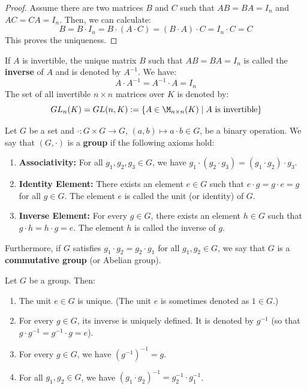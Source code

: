 \begin{proof}
Assume there are two matrices $B$ and $C$ such that $AB = BA = I_n$ and $AC = CA = I_n$. Then, we can calculate:
\begin{equation*}
    B = B \cdot I_n = B \cdot (A \cdot C) = (B \cdot A) \cdot C = I_n \cdot C = C
\end{equation*}
This proves the uniqueness.
\end{proof}

\begin{definition}
If $A$ is invertible, the unique matrix $B$ such that $AB = BA = I_n$ is called the \textbf{inverse} of $A$ and is denoted by $A^{-1}$. We have:
\begin{equation*}
    A \cdot A^{-1} = A^{-1} \cdot A = I_n
\end{equation*}
The set of all invertible $n \times n$ matrices over $K$ is denoted by:
\begin{equation*}
    GL_n(K) = GL(n, K) := \{A \in \M_{n \times n}(K) \mid A \text{ is invertible}\}
\end{equation*}
\end{definition}

\begin{definition}[Group]
Let $G$ be a set and $\cdot : G \times G \to G$, $(a,b) \mapsto a \cdot b \in G$, be a binary operation. We say that $(G, \cdot)$ is a \textbf{group} if the following axioms hold:
\begin{enumerate}
    \item \textbf{Associativity:} For all $g_1, g_2, g_3 \in G$, we have $g_1 \cdot (g_2 \cdot g_3) = (g_1 \cdot g_2) \cdot g_3$.
    \item \textbf{Identity Element:} There exists an element $e \in G$ such that $e \cdot g = g \cdot e = g$ for all $g \in G$. The element $e$ is called the unit (or identity) of $G$.
    \item \textbf{Inverse Element:} For every $g \in G$, there exists an element $h \in G$ such that $g \cdot h = h \cdot g = e$. The element $h$ is called the inverse of $g$.
\end{enumerate}
Furthermore, if $G$ satisfies $g_1 \cdot g_2 = g_2 \cdot g_1$ for all $g_1, g_2 \in G$, we say that $G$ is a \textbf{commutative group} (or Abelian group).
\end{definition}

\begin{proposition} \label{prop:17.a.6}
Let $G$ be a group. Then:
\begin{enumerate}
    \item The unit $e \in G$ is unique. (The unit $e$ is sometimes denoted as $1 \in G$.)
    \item For every $g \in G$, its inverse is uniquely defined. It is denoted by $g^{-1}$ (so that $g \cdot g^{-1} = g^{-1} \cdot g = e$).
    \item For every $g \in G$, we have $(g^{-1})^{-1} = g$.
    \item For all $g_1, g_2 \in G$, we have $(g_1 \cdot g_2)^{-1} = g_2^{-1} \cdot g_1^{-1}$.
\end{enumerate}
\end{proposition}

